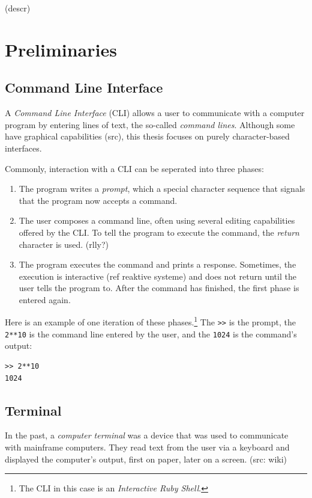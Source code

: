 \documentclass[paper=a4,abstract=on,cleardoublepage=empty,numbers=noenddot,toc=bib]{scrreprt}
\begin{document}
(descr)

\chapter{Preliminaries}

\section{Command Line Interface}

A \emph{Command Line Interface} (\textsc{CLI}) allows a user to communicate with a computer program by entering lines of text, the so-called \emph{command lines}. Although some have graphical capabilities (src), this thesis focuses on purely character-based interfaces.

Commonly, interaction with a \textsc{CLI} can be seperated into three phases:

\begin{enumerate}
    \item The program writes a \emph{prompt}, which a special character sequence that signals that the program now accepts a command.
    \item The user composes a command line, often using several editing capabilities offered by the CLI. To tell the program to execute the command, the \emph{return} character is used. (rlly?)
    \item The program executes the command and prints a response. Sometimes, the execution is interactive (ref reaktive systeme) and does not return until the user tells the program to. After the command has finished, the first phase is entered again.
\end{enumerate}

Here is an example of one iteration of these phases.\footnote{The \textsc{CLI} in this case is an \emph{Interactive Ruby Shell}.} The \texttt{>\->} is the prompt, the \texttt{2**10} is the command line entered by the user, and the \texttt{1024} is the command's output:

\begin{lstlisting}
>> 2**10
1024
\end{lstlisting}

\section{Terminal}

In the past, a \emph{computer terminal} was a device that was used to communicate with mainframe computers. They read text from the user via a keyboard and displayed the computer's output, first on paper, later on a screen. (src: wiki)
\end{document}
